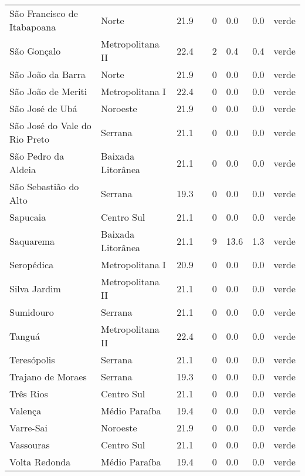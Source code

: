 \begin{longtable}{l|lllllll}
  São Francisco de Itabapoana & Norte & 21.9 &  & 0 & 0.0 & 0.0 & verde \\ 
  São Gonçalo & Metropolitana II & 22.4 &  & 2 & 0.4 & 0.4 & verde \\ 
  São João da Barra & Norte & 21.9 &  & 0 & 0.0 & 0.0 & verde \\ 
  São João de Meriti & Metropolitana I & 22.4 &  & 0 & 0.0 & 0.0 & verde \\ 
  São José de Ubá & Noroeste & 21.9 &  & 0 & 0.0 & 0.0 & verde \\ 
  São José do Vale do Rio Preto & Serrana & 21.1 &  & 0 & 0.0 & 0.0 & verde \\ 
  São Pedro da Aldeia & Baixada Litorânea & 21.1 &  & 0 & 0.0 & 0.0 & verde \\ 
  São Sebastião do Alto & Serrana & 19.3 &  & 0 & 0.0 & 0.0 & verde \\ 
  Sapucaia & Centro Sul & 21.1 &  & 0 & 0.0 & 0.0 & verde \\ 
  Saquarema & Baixada Litorânea & 21.1 &  & 9 & 13.6 & 1.3 & verde \\ 
  Seropédica & Metropolitana I & 20.9 &  & 0 & 0.0 & 0.0 & verde \\ 
  Silva Jardim & Metropolitana II & 21.1 &  & 0 & 0.0 & 0.0 & verde \\ 
  Sumidouro & Serrana & 21.1 &  & 0 & 0.0 & 0.0 & verde \\ 
  Tanguá & Metropolitana II & 22.4 &  & 0 & 0.0 & 0.0 & verde \\ 
  Teresópolis & Serrana & 21.1 &  & 0 & 0.0 & 0.0 & verde \\ 
  Trajano de Moraes & Serrana & 19.3 &  & 0 & 0.0 & 0.0 & verde \\ 
  Três Rios & Centro Sul & 21.1 &  & 0 & 0.0 & 0.0 & verde \\ 
  Valença & Médio Paraíba & 19.4 &  & 0 & 0.0 & 0.0 & verde \\ 
  Varre-Sai & Noroeste & 21.9 &  & 0 & 0.0 & 0.0 & verde \\ 
  Vassouras & Centro Sul & 21.1 &  & 0 & 0.0 & 0.0 & verde \\ 
  Volta Redonda & Médio Paraíba & 19.4 &  & 0 & 0.0 & 0.0 & verde \\ 
  \hline
\end{longtable}
